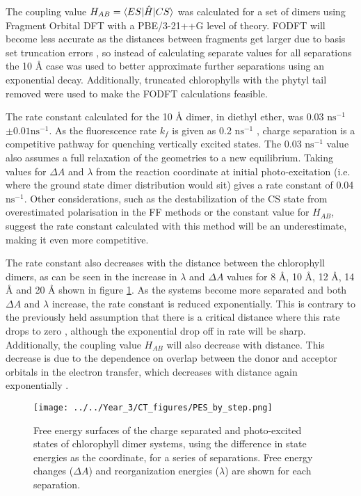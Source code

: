 The coupling value $H_{AB} = \braket{ES|\hat{H}|CS}$ was calculated for a set of
dimers using Fragment Orbital DFT with a PBE/3-21++G level of theory. FODFT will
become less accurate as the distances between fragments get larger due to basis
set truncation errors \cite{Oberhofer2012, Obenhofer2017}, so instead of calculating
separate values for all separations the 10 \AA{} case was used to better approximate 
further separations using an exponential decay. Additionally, truncated chlorophylls
with the phytyl tail removed were used to make the FODFT calculations feasible.

The rate constant calculated for the 10 \AA{} dimer, in diethyl ether, was 
0.03 $\text{ns}^{-1}$ $\pm 0.01 \text{ns}^{-1}$. As the fluorescence
rate $k_f$ is given as 0.2 $\text{ns}^{-1}$ \cite{Brody2002}, charge separation
is a competitive pathway for quenching vertically excited states. The 0.03 $\text{ns}^{-1}$
value also assumes a full relaxation of the geometries to a new equilibrium. Taking
values for $\Delta A$ and $\lambda$ from the reaction coordinate at initial photo-excitation 
(i.e. where the ground state dimer distribution would sit) gives a rate constant
of 0.04 $\text{ns}^{-1}$. Other considerations, such as the destabilization of the
CS state from overestimated polarisation in the FF methods or the constant value
for $H_{AB}$, suggest the rate constant calculated with this method will be an underestimate,
making it even more competitive.

The rate constant also decreases with the distance between the chlorophyll dimers, as can
be seen in the increase in $\lambda$ and $\Delta A$ values for 8 \AA{}, 10 \AA{},
12 \AA{}, 14 \AA{} and 20 \AA{} shown in figure \ref{fig:ct_pes_distance}. 
As the systems become more separated and both $\Delta A$ and $\lambda$ increase, 
the rate constant is reduced exponentially. This is contrary to the previously held
assumption that there is a critical distance where this rate drops to zero \cite{Beddard1976},
although the exponential drop off in rate will be sharp. Additionally, the coupling
value $H_{AB}$ will also decrease with distance. This decrease is due to the dependence 
on overlap between the donor and acceptor orbitals in the electron transfer, which 
decreases with distance again exponentially \cite{Kubas2015, Silver1968, Handy1969}.

\begin{figure}
    \centering
    \texttt{[image: ../../Year\_3/CT\_figures/PES\_by\_step.png]}
    \caption{Free energy surfaces of the charge separated and photo-excited
    states of chlorophyll dimer systems, using the difference in state energies 
    as the coordinate, for a series of separations. Free energy changes ($\Delta A$)
    and reorganization energies ($\lambda$) are shown for each separation.}
    \label{fig:ct_pes_distance}
\end{figure}

